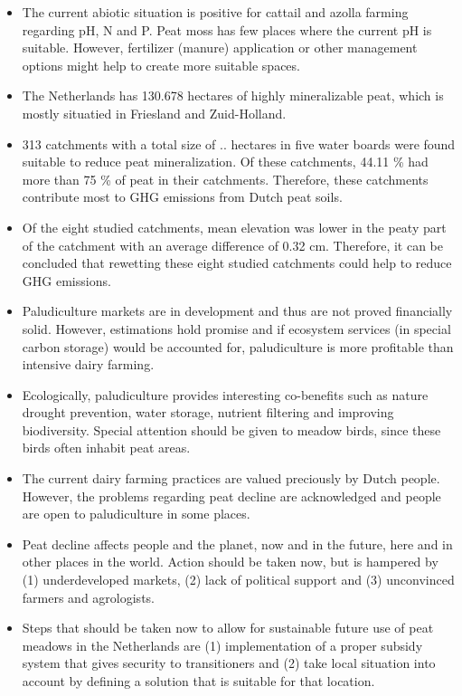 {\begin{itemize}
\item The current abiotic situation is positive for cattail and azolla farming regarding pH, N and P. Peat moss has few places where the current pH is suitable. However, fertilizer (manure) application or other management options might help to create more suitable spaces.
\item The Netherlands has 130.678 hectares of highly mineralizable peat, which is mostly situatied in Friesland and Zuid-Holland. 
\item 313 catchments with a total size of .. hectares in five water boards were found suitable to reduce peat mineralization. Of these catchments, 44.11 \% had more than 75 \% of peat in their catchments. Therefore, these catchments contribute most to GHG emissions from Dutch peat soils.
\item Of the eight studied catchments, mean elevation was lower in the peaty part of the catchment with an average difference of 0.32 cm. Therefore, it can be concluded that rewetting these eight studied catchments could help to reduce GHG emissions.
\item Paludiculture markets are in development and thus are not proved financially solid. However, estimations hold promise and if ecosystem services (in special carbon storage) would be accounted for, paludiculture is more profitable than intensive dairy farming.
\item Ecologically, paludiculture provides interesting co-benefits such as nature drought prevention, water storage, nutrient filtering and improving biodiversity. Special attention should be given to meadow birds, since these birds often inhabit peat areas.
\item The current dairy farming practices are valued preciously by Dutch people. However, the problems regarding peat decline are acknowledged and people are open to paludiculture in some places. 
\item Peat decline affects people and the planet, now and in the future, here and in other places in the world. Action should be taken now, but is hampered by (1) underdeveloped markets, (2) lack of political support and (3) unconvinced farmers and agrologists. 
\item Steps that should be taken now to allow for sustainable future use of peat meadows in the Netherlands are (1) implementation of a proper subsidy system that gives security to transitioners and (2) take local situation into account by defining a solution that is suitable for that location.
\end{itemize}

}
